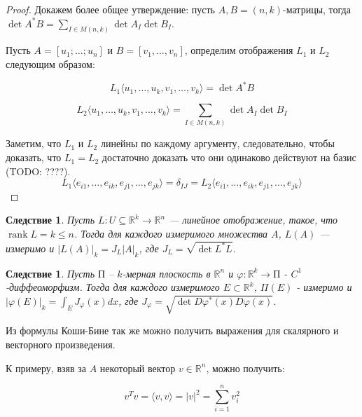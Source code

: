 \documentclass[a5paper]{article}
\newcounter{through}
\theoremstyle{plain}
\newtheorem{corollary}[through]{Следствие}
\theoremstyle{definition}
\numberwithin{through}{section}
\numberwithin{equation}{section}
\DeclareMathOperator{\rank}{rank}
\begin{document}
\begin{proof}
	Докажем более общее утверждение: пусть $A, B = (n, k)$-матрицы, тогда $\det A^* B = \sum\limits_{I \in M(n, k)} \det A_I \det B_I$.
	
	Пусть $A = [u_1; \ldots; u_n]$ и $B = [v_1, \ldots, v_n]$, определим отображения $L_1$ и $L_2$ следующим образом:
	
	\begin{equation*}
		L_1 \langle u_1, \ldots, u_k, v_1, \ldots, v_k \rangle = \det A^* B 
	\end{equation*}
	
	\begin{equation*}
		L_2 \langle u_1, \ldots, u_k, v_1, \ldots, v_k \rangle = \sum\limits_{I \in M(n, k)} \det A_I \det B_I
	\end{equation*}
	
	Заметим, что $L_1$ и $L_2$ линейны по каждому аргументу, следовательно, чтобы доказать, что $L_1=L_2$ достаточно доказать что они одинаково действуют на базис (TODO: ????).
	\begin{equation*}
	L_1 \langle e_{i1}, \ldots, e_{ik}, e_{j1}, \ldots, e_{jk} \rangle = \delta_{IJ} = L_2 \langle e_{i1}, \ldots, e_{ik}, e_{j1}, \ldots, e_{jk} \rangle
	\end{equation*}
\end{proof}

\begin{corollary}
	Пусть $L : U \subseteq \mathbb{R}^k \to \mathbb{R}^n$ --- линейное отображение, такое, что $\rank L = k \leq n$. Тогда для каждого измеримого множества $A$, $L(A)$ --- измеримо и $| L(A) |_k = J_L |A|_k$, где $J_L = \sqrt{\det L^* L}$.
\end{corollary}

\begin{corollary}
	Пусть $\text{П}$ -- $k$-мерная плоскость в $\mathbb{R}^n$ и $\varphi : \mathbb{R}^k \to \text{П}$ - $C^1$-диффеоморфизм. Тогда для каждого измеримого $E \subset \mathbb{R}^k$, $\varPi(E)$ - измеримо и $|\varphi(E)|_k=\int_{E}^{} J_{\varphi}(x)dx$, где $J_{\varphi} = \sqrt{\det D \varphi^* (x) D \varphi(x)}$.
\end{corollary}

Из формулы Коши-Бине так же можно получить выражения для скалярного и векторного произведения. 

К примеру, взяв за $A$ некоторый вектор $v \in \mathbb{R}^n$, можно получить:

\begin{equation*}
	v^T v = \langle v, v \rangle = |v|^2=\sum\limits_{i=1}^n v_i^2
\end{equation*}
\end{document}
